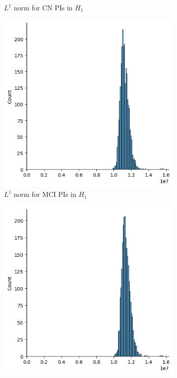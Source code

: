 \documentclass{article}
\begin{document}
\begin{figure}
\begin{subfigure}{0.32\textwidth}
    \caption{$L^1$ norm for CN PIs in $H_1$}
  \end{subfigure}
  \begin{subfigure}{0.32\textwidth}
    \includegraphics[width=\textwidth]{figures/PIs/displot_median_pi_MCI_H_1.png}
    \caption{$L^1$ norm for MCI PIs in $H_1$}
  \end{subfigure}
  \begin{subfigure}{0.32\textwidth}
    \includegraphics[width=\textwidth]{figures/PIs/displot_median_pi_AD_H_1.png}

\end{subfigure}
\end{figure}
\end{document}

